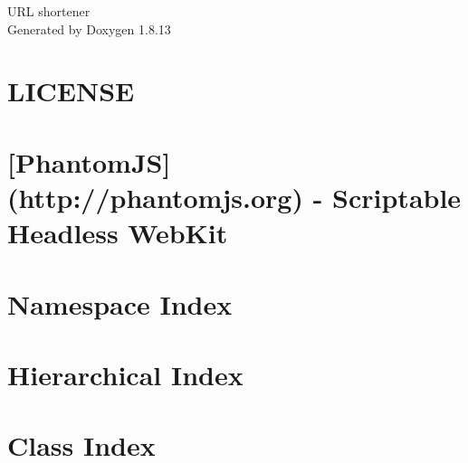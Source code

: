 \documentclass[twoside]{book}
\newcommand{\+}{\discretionary{\mbox{\scriptsize$\hookleftarrow$}}{}{}}
\newcommand{\clearemptydoublepage}{%
  \newpage{\pagestyle{empty}\cleardoublepage}%
}
\begin{document}
\hypersetup{pageanchor=false,
             bookmarksnumbered=true,
             pdfencoding=unicode
            }
\begin{titlepage}
\vspace*{7cm}
\begin{center}%
{\Large U\+RL shortener }\\
\vspace*{1cm}
{\large Generated by Doxygen 1.8.13}\\
\end{center}
\end{titlepage}
\clearemptydoublepage
{}
\tableofcontents
\clearemptydoublepage
{}
\hypersetup{pageanchor=true}

\chapter{L\+I\+C\+E\+N\+SE}
\label{md__c_1__users__marcos__de__moya__documents__git_hub_wa_ass8_packages__newtonsoft_8_json_810_80_82__l_i_c_e_n_s_e}

\chapter{\mbox{[}Phantom\+JS\mbox{]}(http\+://phantomjs.org) -\/ Scriptable Headless Web\+Kit}
\label{md__c_1__users__marcos__de__moya__documents__git_hub_wa_ass8_packages__phantom_j_s_82_81_81_tools_phantomjs__r_e_a_d_m_e}

\chapter{Namespace Index}

\chapter{Hierarchical Index}

\chapter{Class Index}

\end{document}
